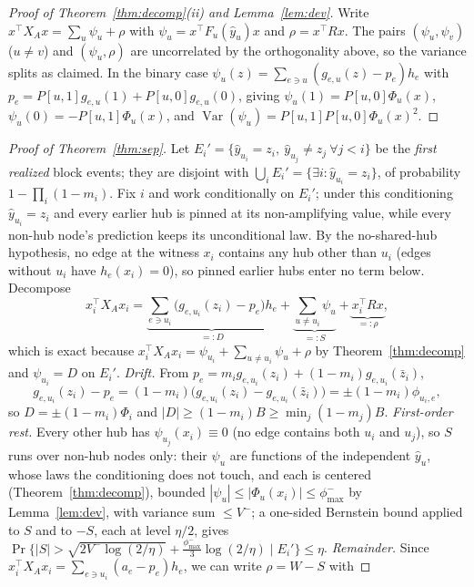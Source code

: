\documentclass[preprint,11pt]{elsarticle}
\begin{document}
\begin{proof}[Proof of Theorem~\ref{thm:decomp}(ii) and
Lemma~\ref{lem:dev}]
Write $x^\top X_Ax=\sum_u\psi_u+\rho$ with
$\psi_u=x^\top F_u(\hat y_u)x$ and $\rho=x^\top Rx$. The pairs
$(\psi_u,\psi_v)$ ($u\ne v$) and $(\psi_u,\rho)$ are uncorrelated by
the orthogonality above, so the variance splits as claimed. In the
binary case $\psi_u(z)=\sum_{e\ni u}(g_{e,u}(z)-p_e)h_e$ with
$p_e=P[u,1]g_{e,u}(1)+P[u,0]g_{e,u}(0)$, giving
$\psi_u(1)=P[u,0]\Phi_u(x)$, $\psi_u(0)=-P[u,1]\Phi_u(x)$, and
$\operatorname{Var}(\psi_u)=P[u,1]P[u,0]\Phi_u(x)^2$.
\end{proof}

\begin{proof}[Proof of Theorem~\ref{thm:sep}]
Let $E_i'=\{\hat y_{u_i}=z_i,\ \hat y_{u_j}\ne z_j\ \forall j<i\}$ be
the \emph{first realized} block events; they are disjoint with
$\bigcup_iE_i'=\{\exists i:\hat y_{u_i}=z_i\}$, of probability
$1-\prod_i(1-m_i)$. Fix $i$ and work conditionally on $E_i'$; under
this conditioning $\hat y_{u_i}=z_i$ and every earlier hub is pinned
at its non-amplifying value, while every non-hub node's prediction
keeps its unconditional law. By the no-shared-hub hypothesis, no edge
at the witness $x_i$ contains any hub other than $u_i$ (edges without
$u_i$ have $h_e(x_i)=0$), so pinned earlier hubs enter no term below.
Decompose
\[
x_i^\top X_Ax_i
=\underbrace{\sum_{e\ni u_i}\bigl(g_{e,u_i}(z_i)-p_e\bigr)h_e}_{=:D}
+\underbrace{\sum_{u\ne u_i}\psi_u}_{=:S}
+\underbrace{x_i^\top Rx}_{=:\rho},
\]
which is exact because $x_i^\top X_Ax_i=\psi_{u_i}+\sum_{u\ne
u_i}\psi_u+\rho$ by Theorem~\ref{thm:decomp} and
$\psi_{u_i}=D$ on $E_i'$.
\emph{Drift.} From $p_e=m_ig_{e,u_i}(z_i)+(1-m_i)g_{e,u_i}(\bar z_i)$,
\[
g_{e,u_i}(z_i)-p_e=(1-m_i)\bigl(g_{e,u_i}(z_i)-g_{e,u_i}(\bar z_i)
\bigr)=\pm(1-m_i)\phi_{u_i,e},
\]
so $D=\pm(1-m_i)\Phi_i$ and $|D|\ge(1-m_i)B\ge\min_j(1-m_j)B$.
\emph{First-order rest.} Every other hub has
$\psi_{u_j}(x_i)\equiv0$ (no edge contains both $u_i$ and $u_j$), so
$S$ runs over non-hub nodes only: their $\psi_u$ are functions of the
independent $\hat y_u$, whose laws the conditioning does not touch,
and each is centered (Theorem~\ref{thm:decomp}), bounded
$|\psi_u|\le|\Phi_u(x_i)|\le\phi^-_{\max}$ by
Lemma~\ref{lem:dev}, with variance sum $\le V^-$; a one-sided
Bernstein bound applied to $S$ and to $-S$, each at level $\eta/2$,
gives
$\Pr\{|S|>\sqrt{2V^-\log(2/\eta)}+\tfrac{\phi^-_{\max}}3
\log(2/\eta)\mid E_i'\}\le\eta$.
\emph{Remainder.} Since
$x_i^\top X_Ax_i=\sum_{e\ni u_i}(a_e-p_e)h_e$, we can write
$\rho=W-S$ with

\end{proof}
\end{document}
